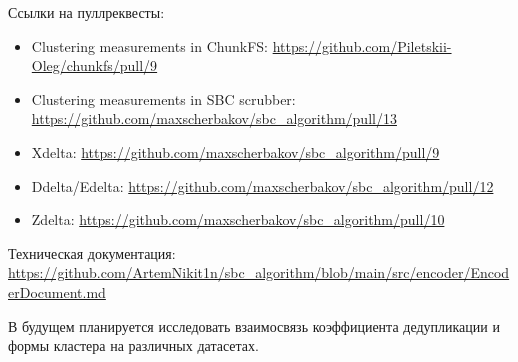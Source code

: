 \documentclass[a4paper]{article}
\begin{document}
Ссылки на пуллреквесты: 
\begin{itemize}
    \item Clustering measurements in ChunkFS: \url{https://github.com/Piletskii-Oleg/chunkfs/pull/9}
    \item Clustering measurements in SBC scrubber: \url{https://github.com/maxscherbakov/sbc_algorithm/pull/13}
    \item Xdelta: \url{https://github.com/maxscherbakov/sbc_algorithm/pull/9}
    \item Ddelta/Edelta: \url{https://github.com/maxscherbakov/sbc_algorithm/pull/12}
    \item Zdelta: \url{https://github.com/maxscherbakov/sbc_algorithm/pull/10}
\end{itemize}

Техническая документация: \url{https://github.com/ArtemNikit1n/sbc_algorithm/blob/main/src/encoder/EncoderDocument.md}

В будущем планируется исследовать взаимосвязь коэффициента дедупликации и формы кластера на различных датасетах.
\end{document}
